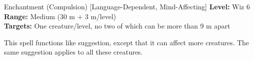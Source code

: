 {Enchantment (Compulsion) [Language-Dependent, Mind-Affecting]}
{
	\textbf{Level:}
	Wiz 6\\
	\textbf{Range:}
	Medium (30 m + 3 m/level)\\
	\textbf{Targets:}
	One creature/level, no two of which can be more than 9 m apart\\
}
{
	This spell functions like suggestion, except that it can affect more creatures. The same suggestion applies to all these creatures.

}
